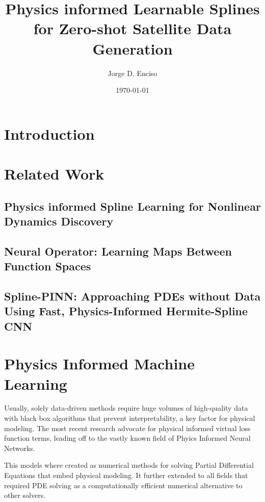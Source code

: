\documentclass[12pt]{article}
\title{Physics informed Learnable Splines for Zero-shot Satellite Data Generation}
\author{Jorge D. Enciso}
\date{\today}
\begin{document}
\maketitle

\begin{abstract}
\end{abstract}

\tableofcontents
\newpage

\section{Introduction}

\section{Related Work}

\subsection{Physics informed Spline Learning for Nonlinear Dynamics Discovery}

\subsection{Neural Operator: Learning Maps Between Function Spaces}

\subsection{Spline-PINN: Approaching PDEs without Data Using Fast, Physics-Informed Hermite-Spline CNN}

\section{Physics Informed Machine Learning}
Usually, solely data-driven methods require huge volumes of high-quality data with black box algorithms that prevent interpretability, a key factor for physical modeling. The most recent research \cite{PINNS} advocate for physical informed virtual loss function terms, leading off to the vastly known field of Phyics Informed Neural Networks.

This models where created as numerical methods for solving Partial Differential Equations that embed physical modeling. It further extended to all fields that required PDE solving as a computationally efficient numerical alternative to other solvers.
\end{document}
